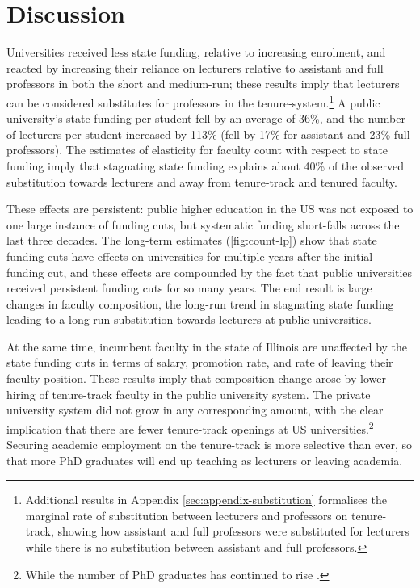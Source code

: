 \section{Discussion}
\label{sec:discussion}

Universities received less state funding, relative to increasing enrolment, and reacted by increasing their reliance on lecturers relative to assistant and full professors in both the short and medium-run; these results imply that lecturers can be considered substitutes for professors in the tenure-system.\footnote{
    Additional results in Appendix \autoref{sec:appendix-substitution} formalises the marginal rate of substitution between lecturers and professors on tenure-track, showing how assistant and full professors were substituted for lecturers while there is no substitution between assistant and full professors.
}
A public university's state funding per student fell by an average of 36\%, and the number of lecturers per student increased by 113\% (fell by 17\% for assistant and 23\% full professors).
The estimates of elasticity for faculty count with respect to state funding imply that stagnating state funding explains about 40\% of the observed substitution towards lecturers and away from tenure-track and tenured faculty.

These effects are persistent: public higher education in the US was not exposed to one large instance of funding cuts, but systematic funding short-falls across the last three decades.
The long-term estimates (\autoref{fig:count-lp}) show that state funding cuts have effects on universities for multiple years after the initial funding cut, and these effects are compounded by the fact that public universities received persistent funding cuts for so many years.
The end result is large changes in faculty composition, the long-run trend in stagnating state funding leading to a long-run substitution towards lecturers at public universities.

At the same time, incumbent faculty in the state of Illinois are unaffected by the state funding cuts in terms of salary, promotion rate, and rate of leaving their faculty position.
These results imply that composition change arose by lower hiring of tenure-track faculty in the public university system.
The private university system did not grow in any corresponding amount, with the clear implication that there are fewer tenure-track openings at US universities.\footnote{
    While the number of PhD graduates has continued to rise \citep{aau2021survey}.
}
Securing academic employment on the tenure-track is more selective than ever, so that more PhD graduates will end up teaching as lecturers or leaving academia.

